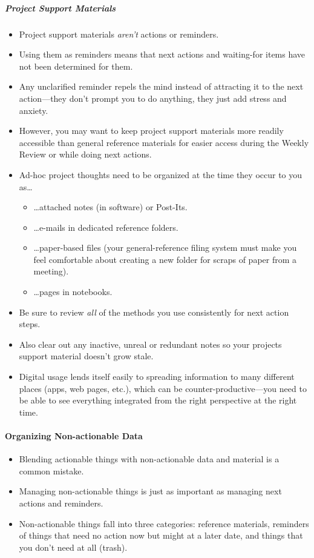 \documentclass{article}
\begin{document}
\subparagraph{Project Support Materials}

\begin{itemize}
  \item Project support materials \emph{aren't} actions or reminders.
  \item Using them as reminders means that next actions and waiting-for items have not been determined for them.
  \item Any unclarified reminder repels the mind instead of attracting it to the next action---they don't prompt you to do anything, they just add stress and anxiety.
  \item However, you may want to keep project support materials more readily accessible than general reference materials for easier access during the Weekly Review or while doing next actions.
  \item Ad-hoc project thoughts need to be organized at the time they occur to you as\ldots
  \begin{itemize}
    \item \ldots attached notes (in software) or Post-Its.
    \item \ldots e-mails in dedicated reference folders.
    \item \ldots paper-based files (your general-reference filing system must make you feel comfortable about creating a new folder for scraps of paper from a meeting).
    \item \ldots pages in notebooks.
  \end{itemize}
  \item Be sure to review \emph{all} of the methods you use consistently for next action steps.
  \item Also clear out any inactive, unreal or redundant notes so your projects support material doesn't grow stale.
  \item Digital usage lends itself easily to spreading information to many different places (apps, web pages, etc.), which can be counter-productive---you need to be able to see everything integrated from the right perspective at the right time.
\end{itemize}

\paragraph{Organizing Non-actionable Data}

\begin{itemize}
  \item Blending actionable things with non-actionable data and material is a common mistake.
  \item Managing non-actionable things is just as important as managing next actions and reminders.
  \item Non-actionable things fall into three categories: reference materials, reminders of things that need no action now but might at a later date, and things that you don't need at all (trash).
\end{itemize}
\end{document}
